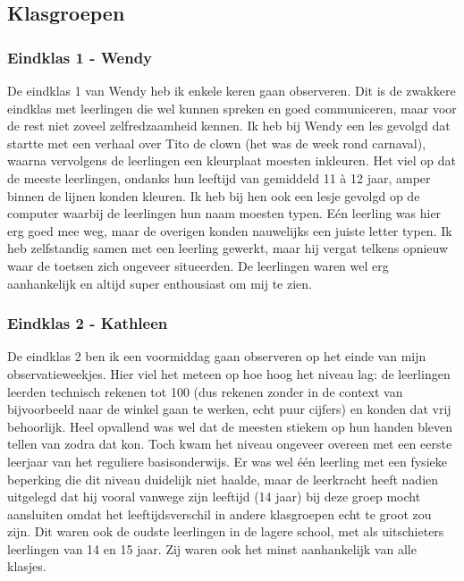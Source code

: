 \documentclass[a4paper,11pt]{article}
\theoremstyle{definition}
\begin{document}
\begin{itemize}
\begin{itemize}
\subsection{Klasgroepen}
\subsubsection{Eindklas 1 - Wendy}
De eindklas 1 van Wendy heb ik enkele keren gaan observeren. Dit is de zwakkere 
eindklas met leerlingen die wel kunnen spreken en goed communiceren, maar voor de rest niet zoveel 
zelfredzaamheid kennen. Ik heb bij Wendy een les gevolgd dat startte met een 
verhaal over Tito de clown (het was de week rond carnaval), waarna vervolgens de 
leerlingen een kleurplaat moesten inkleuren. Het viel op dat de meeste leerlingen, ondanks hun leeftijd van gemiddeld
11 à 12 jaar, amper binnen de lijnen konden kleuren. Ik heb bij hen ook een 
lesje gevolgd op de computer waarbij de leerlingen hun naam moesten typen. Eén 
leerling was hier erg goed mee weg, maar de overigen konden nauwelijks een 
juiste letter typen. Ik heb zelfstandig samen met een leerling gewerkt, maar hij 
vergat telkens opnieuw waar de toetsen zich ongeveer situeerden. De leerlingen 
waren wel erg aanhankelijk en altijd super enthousiast om mij te zien.

\subsubsection{Eindklas 2 - Kathleen}
De eindklas 2 ben ik een voormiddag gaan observeren op het einde van mijn observatieweekjes. 
Hier viel het meteen op hoe hoog het niveau lag: de leerlingen leerden technisch 
rekenen tot 100 (dus rekenen zonder in de context van bijvoorbeeld naar de winkel gaan te werken, echt puur cijfers) 
en konden dat vrij behoorlijk. Heel opvallend was wel dat de meesten stiekem op 
hun handen bleven tellen van zodra dat kon. Toch kwam het niveau ongeveer overeen met een eerste leerjaar van het reguliere basisonderwijs. 
Er was wel één leerling met een fysieke beperking die dit niveau duidelijk niet 
haalde, maar de leerkracht heeft nadien uitgelegd dat hij vooral vanwege zijn 
leeftijd (14 jaar) bij deze groep mocht aansluiten omdat het leeftijdsverschil 
in andere klasgroepen echt te groot zou zijn.
Dit waren ook de oudste leerlingen in de lagere school, met als uitschieters
leerlingen van 14 en 15 jaar. Zij waren ook het minst aanhankelijk van alle klasjes.\\


\end{itemize}
\end{itemize}
\end{document}
